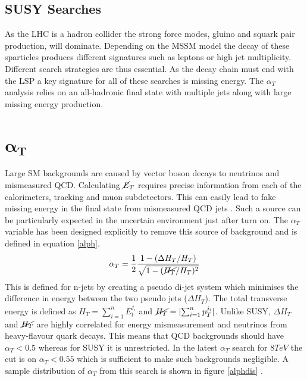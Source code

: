 \subsection{SUSY Searches}
As the LHC is a hadron collider the strong force modes, gluino and squark pair production, will dominate. Depending on the MSSM model the decay of these sparticles produces different signatures such as leptons or high jet multiplicity. Different search strategies are thus essential. As the decay chain must end with the LSP a key signature for all of these searches is missing energy. The $\alpha_T$ analysis relies on an all-hadronic final state with multiple jets along with large missing energy production. 

\section{$\boldsymbol{\alpha_T}$}
Large SM backgrounds are caused by vector boson decays to neutrinos and mismeasured QCD. Calculating $\cancel{\it{E}}_{T}$ requires precise information from each of the calorimeters, tracking and muon subdetectors. This can easily lead to fake missing energy in the final state from mismeasured QCD jets \cite{randall}. Such a source can be particularly expected in the uncertain environment just after turn on.  The $\alpha_T$ variable has been designed explicitly to remove this source of background and is defined in equation \ref{alph}.
\begin{equation}
\label{alph}
\alpha_T=\frac{1}{2}\frac{1-(\Delta H_T/H_T)}{\sqrt{1-(\cancel{H_T}/H_T)^2}}
\end{equation}
This is defined for n-jets by creating a pseudo di-jet system which minimises the difference in energy between the two pseudo jets ($\Delta H_T$). The total transverse energy is defined as $H_T=\sum_{i=1}^nE_t^{j_i}$ and $\cancel{H_T}=|{\sum_{i=1}^n p_T^{j_i}}|$. Unlike SUSY, $\Delta H_T$ and $\cancel{H_T}$ are highly correlated for energy mismeasurement and neutrinos from heavy-flavour quark decays. This means that QCD backgrounds should have $\alpha_T<0.5$ whereas for SUSY it is unrestricted. In the latest $\alpha_T$ search for $8 TeV$ the cut is on $\alpha_T<0.55$ which is sufficient to make such backgrounds negligible. A sample distribution of $\alpha_T$ from this search is shown in figure \ref{alphdis} \cite{CMSAT8}.
